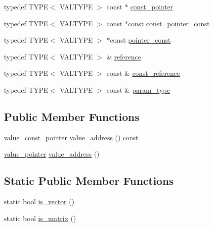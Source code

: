 \begin{DoxyCompactItemize}
\item 
typedef T\+Y\+PE$<$ V\+A\+L\+T\+Y\+PE $>$ const  $\ast$ \mbox{\hyperlink{structglm_1_1detail_1_1gen_type_ade82fbfd7b15096223e1b133c148b5e2}{const\+\_\+pointer}}
\item 
typedef T\+Y\+PE$<$ V\+A\+L\+T\+Y\+PE $>$ const  $\ast$const \mbox{\hyperlink{structglm_1_1detail_1_1gen_type_a4f3f1bc18abdbdba5757fc63052157fa}{const\+\_\+pointer\+\_\+const}}
\item 
typedef T\+Y\+PE$<$ V\+A\+L\+T\+Y\+PE $>$ $\ast$const \mbox{\hyperlink{structglm_1_1detail_1_1gen_type_a4d7745054035d7efed18ec1d7215bbf0}{pointer\+\_\+const}}
\item 
typedef T\+Y\+PE$<$ V\+A\+L\+T\+Y\+PE $>$ \& \mbox{\hyperlink{structglm_1_1detail_1_1gen_type_a14792cf03ce9cfb37becd2da5d9ae06a}{reference}}
\item 
typedef T\+Y\+PE$<$ V\+A\+L\+T\+Y\+PE $>$ const  \& \mbox{\hyperlink{structglm_1_1detail_1_1gen_type_a509ca374a85f8a9ea319bc5a980d5f1a}{const\+\_\+reference}}
\item 
typedef T\+Y\+PE$<$ V\+A\+L\+T\+Y\+PE $>$ const  \& \mbox{\hyperlink{structglm_1_1detail_1_1gen_type_a92c8b989f574a63d4e0f5bfc8a4f3a32}{param\+\_\+type}}
\end{DoxyCompactItemize}
\subsection*{Public Member Functions}
\begin{DoxyCompactItemize}
\item 
\mbox{\hyperlink{structglm_1_1detail_1_1gen_type_a34e169ae6d50e1c76574c850eae2c7fc}{value\+\_\+const\+\_\+pointer}} \mbox{\hyperlink{structglm_1_1detail_1_1gen_type_a5dcc128cfa6f3fdc478d7169ec3cb71b}{value\+\_\+address}} () const
\item 
\mbox{\hyperlink{structglm_1_1detail_1_1gen_type_a3b272e7be29ab920f2877c00646f6f9b}{value\+\_\+pointer}} \mbox{\hyperlink{structglm_1_1detail_1_1gen_type_a146973ec142766743080c1895a9e3c65}{value\+\_\+address}} ()
\end{DoxyCompactItemize}
\subsection*{Static Public Member Functions}
\begin{DoxyCompactItemize}
\item 
static bool \mbox{\hyperlink{structglm_1_1detail_1_1gen_type_ae83087df55201bdc46a37decf3d1c34c}{is\+\_\+vector}} ()
\item 
static bool \mbox{\hyperlink{structglm_1_1detail_1_1gen_type_a78c650375558d5e2ccfba383cdb59479}{is\+\_\+matrix}} ()
\end{DoxyCompactItemize}


